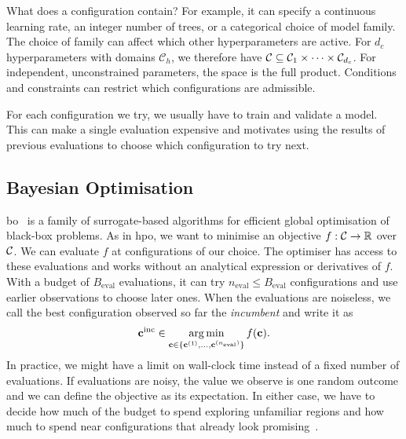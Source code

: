 What does a configuration contain? For example, it can specify a continuous learning rate, an integer number of trees, or a categorical choice of model family. The choice of family can affect which other hyperparameters are active. For $d_c$ hyperparameters with domains $\mathcal C_h$, we therefore have $\mathcal{C}\subseteq\mathcal C_1\times\cdots\times\mathcal C_{d_c}$. For independent, unconstrained parameters, the space is the full product. Conditions and constraints can restrict which configurations are admissible.

For each configuration we try, we usually have to train and validate a model. This can make a single evaluation expensive and motivates using the results of previous evaluations to choose which configuration to try next.

\subsection{Bayesian Optimisation}
\label{sec:ch02:bac_bo}

\Gls{bo}~\citep{Mockus12b,Garnett23,Frazier18b,Kushner62,Kushner64b} is a family of surrogate-based algorithms for efficient global optimisation of black-box problems.
As in \gls{hpo}, we want to minimise an objective $f:\mathcal{C}\rightarrow\mathbb R$ over $\mathcal{C}$. We can evaluate $f$ at configurations of our choice. The optimiser has access to these evaluations and works without an analytical expression or derivatives of $f$. With a budget of $B_{\mathrm{eval}}$ evaluations, it can try $n_{\mathrm{eval}}\leq B_{\mathrm{eval}}$ configurations and use earlier observations to choose later ones. When the evaluations are noiseless, we call the best configuration observed so far the \emph{incumbent} and write it as
\begin{equation*}
    \mathbf{c}^{\mathrm{inc}} \in
    \operatorname*{arg\,min}_{\mathbf{c}\in
    \{\mathbf{c}^{(1)},\ldots,\mathbf{c}^{(n_{\mathrm{eval}})}\}}
    f(\mathbf{c}).
\end{equation*}
In practice, we might have a limit on wall-clock time instead of a fixed number of evaluations. If evaluations are noisy, the value we observe is one random outcome and we can define the objective as its expectation. In either case, we have to decide how much of the budget to spend exploring unfamiliar regions and how much to spend near configurations that already look promising~\citep{Garnett23}.


